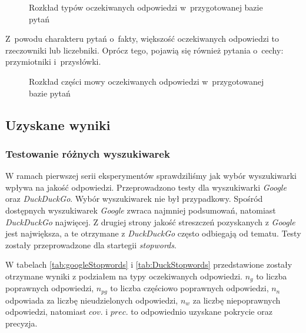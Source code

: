 \begin{figure}[h!]
    \label{fig:rozklad-typow-odpowiedzi}  
    \caption{Rozkład typów oczekiwanych odpowiedzi w~przygotowanej bazie pytań}
\end{figure}

Z~powodu charakteru pytań o~fakty, większość oczekiwanych odpowiedzi to rzeczowniki lub liczebniki. Oprócz tego, pojawią się również pytania o~cechy: przymiotniki i~przysłówki.

\begin{figure}[h!]
    \label{fig:rozklad-typow-odpowiedzi2}  
    \caption{Rozkład części mowy oczekiwanych odpowiedzi w~przygotowanej bazie pytań}
\end{figure}

\subsection{Uzyskane wyniki}

\subsubsection{Testowanie różnych wyszukiwarek}
W ramach pierwszej serii eksperymentów sprawdziliśmy jak wybór wyszukiwarki wpływa na jakość odpowiedzi. Przeprowadzono testy dla wyszukiwarki \textit{Google} oraz \textit{DuckDuckGo}. Wybór wyszukiwarek nie był przypadkowy. Spośród dostępnych wyszukiwarek \textit{Google} zwraca najmniej podsumowań, natomiast \textit{DuckDuckGo} najwięcej. Z drugiej strony jakość streszczeń pozyskanych z \textit{Google} jest największa, a te otrzymane z \textit{DuckDuckGo} często odbiegają od tematu. Testy zostały przeprowadzone dla startegii \textit{stopwords}.

W tabelach \ref{tab:googleStopwords} i \ref{tab:DuckStopwords} przedstawione zostały otrzymane wyniki z podziałem na typy oczekiwanych odpowiedzi. $n_g$ to liczba poprawnych odpowiedzi, $n_{pg}$ to liczba częściowo poprawnych odpowiedzi, $n_n$ odpowiada za liczbę nieudzielonych odpowiedzi, $n_w$ za liczbę niepoprawnych odpowiedzi, natomiast $cov.$ i $prec.$ to odpowiednio uzyskane pokrycie oraz precyzja.

